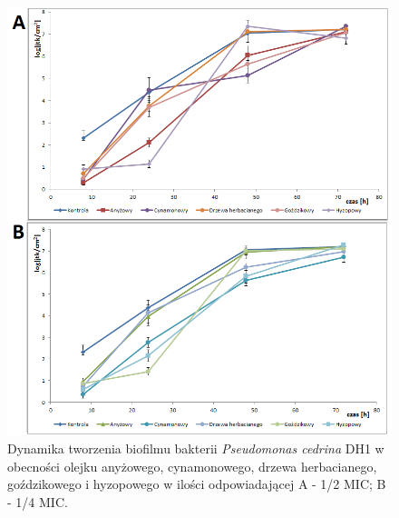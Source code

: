 \documentclass[11pt,a4paper]{report}
\begin{document}
\begin{figure}[!h]
\begin{center}
\includegraphics[scale=0.61]{img/pc-a.png}
\caption{Dynamika tworzenia biofilmu bakterii \textit{Pseudomonas cedrina} DH1 w obecności olejku anyżowego, cynamonowego, drzewa herbacianego, goździkowego i hyzopowego w ilości odpowiadającej A - 1/2 MIC; B - 1/4 MIC.}\label{pc-a}
\end{center} 
\end{figure}
\end{document}
